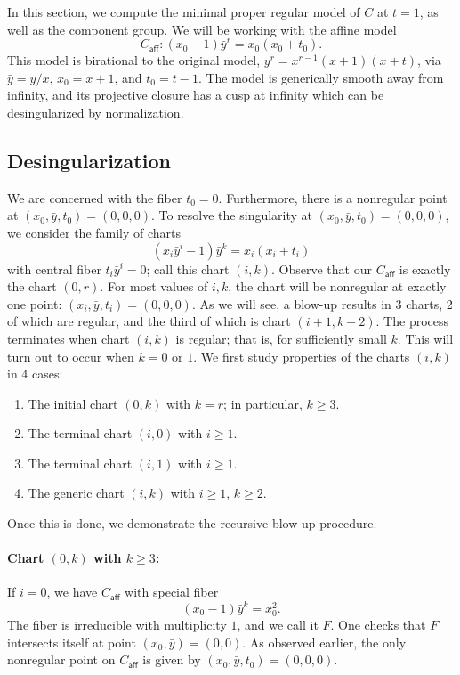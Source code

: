 \documentclass[reqno]{amsart}
\theoremstyle{definition}
\theoremstyle{remark}
\newcommand{\sy}{\bar{y}}
\def\caff{C_{\textsf{aff}}}
\begin{document}
In this section, we compute the minimal proper regular model of $C$ at $t = 1$, as well as the component group. We will be working with the affine model
\[
\caff: (x_0 - 1) \sy^r = x_0(x_0 + t_0).
\]
This model is birational to the original model, $y^r = x^{r-1}(x+1)(x+t)$, via $\sy = y/x$, $x_0 = x + 1$, and $t_0 = t - 1$. The model is generically smooth away from infinity, and its projective closure has a cusp at infinity which can be desingularized by normalization. 

\subsection{Desingularization}
\label{sec:desingularization-t-equals-one}

We are concerned with the fiber $t_0 = 0$. Furthermore, there is a nonregular point at $(x_0, \sy, t_0) = (0, 0, 0)$. To resolve the singularity at $(x_0, \sy, t_0) = (0, 0, 0)$, we consider the family of charts
\[
(x_i\sy^i - 1) \sy^k = x_i(x_i + t_i)
\]
with central fiber $t_i\sy^i = 0$; call this chart $(i,k)$. Observe that our $\caff$ is exactly the chart $(0,r)$. For most values of $i, k$, the chart will be nonregular at exactly one point: $(x_i, \sy, t_i) = (0, 0, 0)$. As we will see, a blow-up results in 3 charts, 2 of which are regular, and the third of which is chart $(i+1, k-2)$. The process terminates when chart $(i, k)$ is regular; that is, for sufficiently small $k$. This will turn out to occur when $k = 0$ or $1$. We first study properties of the charts $(i, k)$ in 4 cases:
\begin{enumerate}
    \item The initial chart $(0, k)$ with $k = r$; in particular, $k \geq 3$.
    \item The terminal chart $(i, 0)$ with $i \geq 1$.
    \item The terminal chart $(i, 1)$ with $i \geq 1$.
    \item The generic chart $(i, k)$ with $i \geq 1$, $k \geq 2$.
\end{enumerate}
Once this is done, we demonstrate the recursive blow-up procedure.

\paragraph{Chart $(0, k)$ with $k \geq 3$:}
\label{sec:case-i=0}

If $i = 0$, we have $\caff$ with special fiber
\[
(x_0 - 1) \sy^k = x_0^2.
\]
The fiber is irreducible with multiplicity $1$, and we call it $F$. One checks that $F$ intersects itself at point $(x_0, \sy) = (0, 0)$. As observed earlier, the only nonregular point on $\caff$ is given by $(x_0, \sy, t_0) = (0, 0, 0)$.
\end{document}

